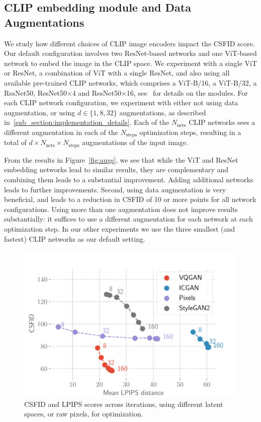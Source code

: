 \subsection{CLIP embedding module and Data Augmentations} 
We study how different choices of \ac{CLIP} image encoders impact the \ac{CSFID} score. 
Our default configuration involves two ResNet-based networks and one ViT-based network 
to embed the image in the \ac{CLIP} space. 
We experiment with a single ViT or ResNet, a combination of ViT with a single  ResNet,  
and also using all available pre-trained \ac{CLIP} networks, which comprises a ViT-B/16, a
 ViT-B/32, a ResNet50, ResNet50$\times$4 and ResNet50$\times$16,
  see~\citep{radford2021learning} for details on the modules.
For each \ac{CLIP} network configuration, we experiment with  either  not using data 
augmentation, or using $d \in\{ 1, 8, 32\}$ augmentations, as described in~\ref{sub_section:implementation_details}.
Each of the $N_\textrm{nets}$ \ac{CLIP} networks sees a different augmentation in each of 
the $N_\textrm{steps}$ optimization steps,  resulting in a total of
 $d \times N_\textrm{nets} \times N_\textrm{steps}$ augmentations of the input image.

From the results in Figure~\ref{fig:augs}, we see that while the  ViT and  ResNet 
embedding networks lead to similar results, they are complementary and combining them 
leads to a substantial improvement.  
Adding additional networks leads to further improvements.
%
Second, using data augmentation is very beneficial, and leads to a reduction in \ac{CSFID} 
of 10 or more points for all network configurations. 
Using more than one augmentation does not improve results substantially: it suffices 
to use a different augmentation for each network at each optimization step.
In our other experiments we use the three smallest (and fastest) \ac{CLIP} networks as our 
default setting.


\begin{figure}
    \centering
    \includegraphics[width=.9\linewidth]{images/flexit/assets/encoder_evol.pdf}
    \caption{\ac{CSFID} and \ac{LPIPS} scores across iterations, using different latent spaces, or raw pixels, for optimization. 
    }
    \label{fig:encoders}
\end{figure}



